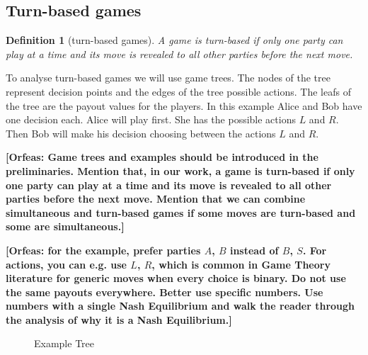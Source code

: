 \documentclass{cacthesis}
\newcommand{\authnote}[3]{{ \footnotesize \textbf{#1[#2: #3]~}}}
\newcommand{\orfnote}[1]{\authnote{\color{blue}}{Orfeas}{#1}}
\newtheorem{definition}{Definition}
\begin{document}
\subsection{Turn-based games}
\begin{definition}[turn-based games]
\label{def:turn-based-game}
A game is turn-based if only one party can play at a time and its move is revealed
to all other parties before the next move.
\end{definition}
To analyse turn-based games we will use game trees. The nodes of the tree represent decision points and the edges of the tree possible actions. The leafs of the tree are the payout values for the players. In this example Alice and Bob have one decision each. Alice will play first. She has the possible actions $L$ and $R$. Then Bob will make his decision choosing between the actions $L$ and $R$. \newline

\orfnote{Game trees and
examples should be introduced in the preliminaries. Mention that, in our work, a
game is turn-based if only one party can play at a time and its move is revealed
to all other parties before the next move. Mention that we can combine
simultaneous and turn-based games if some moves are turn-based and some are
simultaneous.}


\orfnote{for the example, prefer parties $A$, $B$ instead
of $B$, $S$. For actions, you can e.g. use $L$, $R$, which is common in Game
Theory literature for generic moves when every choice is binary. Do not use the
same payouts everywhere. Better use specific numbers. Use numbers with a single
Nash Equilibrium and walk the reader through the analysis of why it is a Nash
Equilibrium.}


\begin{figure}[htb!]
    \centering
    \caption{Example Tree}
    \label{fig:example-tree}
\end{figure}
\end{document}

